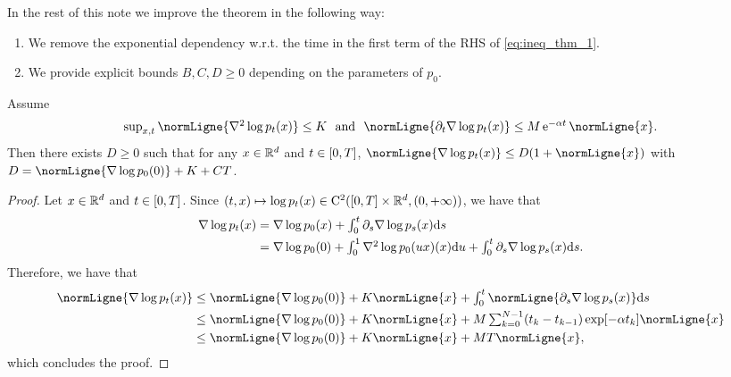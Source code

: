 In the rest of this note we improve the theorem in the following way:
\begin{enumerate}[label=(\alph*)]
\item We remove the exponential dependency w.r.t. the time in the first term of the RHS of \eqref{eq:ineq_thm_1}.
\item We provide explicit bounds $B, C, D \geq 0$ depending on the parameters of $p_0$.
\end{enumerate}

\begin{lemma}
  \label{lemma:control_growth}
  Assume
  \begin{equation}\label{params:thm2_app}
    \textstyle{
  \sup_{x,t} \normLigne{\nabla^2 \log p_t(x)} \leq
  \Ktt}~~\mbox{and}~~
  \textstyle{\normLigne{\partial_t \nabla \log p_t(x)} \leq \Mtt\, \rme^{-\alpha t}\,
  \normLigne{x}}.
  \end{equation}
  Then there exists $D \geq 0$ such that for any
  $x \in \mathbb{R}^d$ and $t \in \left[0,T\right]$,
  $\normLigne{\nabla \log p_t(x)} \leq D(1 + \normLigne{x})$ with
  $D = \normLigne{\nabla \log p_0(0)} + \Ktt + C T$.
\end{lemma}

\begin{proof}
  Let $x \in \mathbb{R}^d$ and $t \in \left[0,T\right]$. Since
  $(t,x) \mapsto \log p_t(x) \in \mathrm{C}^{2}(\left[0,T\right]\times \mathbb{R}^d,
  \left(0,+\infty\right))$, we have that
  \begin{align}
    \textstyle{
      \nabla \log p_t(x)} &= \textstyle{\nabla \log p_0(x) + \int_0^t \partial_s \nabla \log p_s(x) \mathrm{d}s }\\
    &=  \textstyle{\nabla \log p_0(0) + \int_0^1 \nabla^2 \log p_{0}(ux)(x) \mathrm{d}u +  \int_0^t \partial_s \nabla \log p_s(x) \mathrm{d}s .
      }
  \end{align}
  Therefore,  we have that
  \begin{align}
    \normLigne{\nabla \log p_t(x)} &\leq \textstyle{\normLigne{\nabla \log p_0(0)} + \Ktt \normLigne{x} +  \int_0^t \normLigne{\partial_s \nabla \log p_s(x)} \rmd s } \\
                                   &\leq \textstyle{\normLigne{\nabla \log p_0(0)} + \Ktt \normLigne{x} +  \Mtt \sum_{k=0}^{N-1}(t_k - t_{k-1}) \exp[-\alpha t_k] \normLigne{x} } \\
                                   &\leq \textstyle{\normLigne{\nabla \log p_0(0)} + \Ktt \normLigne{x} +  \Mtt T \normLigne{x} } ,
  \end{align}
which concludes the proof.
\end{proof}

